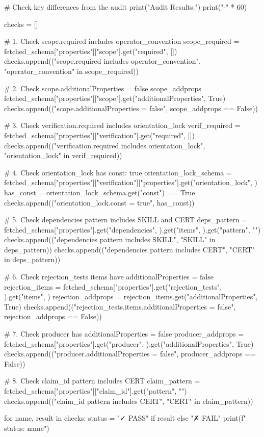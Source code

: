 # Check key differences from the audit
print("\nSchema Audit Results:")
print("-" * 60)

checks = []

# 1. Check scope.required includes operator_convention
scope_required = fetched_schema["properties"]["scope"].get("required", [])
checks.append(("scope.required includes operator_convention", "operator_convention" in scope_required))

# 2. Check scope.additionalProperties = false
scope_addprops = fetched_schema["properties"]["scope"].get("additionalProperties", True)
checks.append(("scope.additionalProperties = false", scope_addprops == False))

# 3. Check verification.required includes orientation_lock
verif_required = fetched_schema["properties"]["verification"].get("required", [])
checks.append(("verification.required includes orientation_lock", "orientation_lock" in verif_required))

# 4. Check orientation_lock has const: true
orientation_lock_schema = fetched_schema["properties"]["verification"]["properties"].get("orientation_lock", {})
has_const = orientation_lock_schema.get("const") == True
checks.append(("orientation_lock.const = true", has_const))

# 5. Check dependencies pattern includes SKILL and CERT
deps_pattern = fetched_schema["properties"].get("dependencies", {}).get("items", {}).get("pattern", "")
checks.append(("dependencies pattern includes SKILL", "SKILL" in deps_pattern))
checks.append(("dependencies pattern includes CERT", "CERT" in deps_pattern))

# 6. Check rejection_tests items have additionalProperties = false
rejection_items = fetched_schema["properties"].get("rejection_tests", {}).get("items", {})
rejection_addprops = rejection_items.get("additionalProperties", True)
checks.append(("rejection_tests.items.additionalProperties = false", rejection_addprops == False))

# 7. Check producer has additionalProperties = false
producer_addprops = fetched_schema["properties"].get("producer", {}).get("additionalProperties", True)
checks.append(("producer.additionalProperties = false", producer_addprops == False))

# 8. Check claim_id pattern includes CERT
claim_pattern = fetched_schema["properties"]["claim_id"].get("pattern", "")
checks.append(("claim_id pattern includes CERT", "CERT" in claim_pattern))

for name, result in checks:
    status = "✓ PASS" if result else "✗ FAIL"
    print(f"  {status}: {name}")


